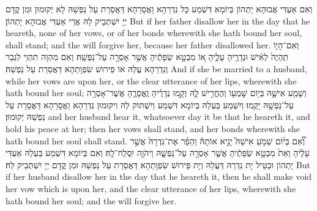 {וְאִם אַעְדִּי אֲבוּהָא יָתְהוֹן בְּיוֹמָא דִּשְׁמַע כָּל נִדְרַהָא וַאֲסָרַהָא דַּאֲסַרַת עַל נַפְשַׁהּ לָא יְקוּמוּן וּמִן קֳדָם יְיָ יִשְׁתְּבֵיק לַהּ אֲרֵי אַעְדִּי אֲבוּהָא יָתְהוֹן׃}
{But if her father disallow her in the day that he heareth, none of her vows, or of her bonds wherewith she hath bound her soul, shall stand; and the \lord\space will forgive her, because her father disallowed her.}{}
{וְאִם־הָי֤וֹ תִֽהְיֶה֙ לְאִ֔ישׁ וּנְדָרֶ֖יהָ עָלֶ֑יהָ א֚וֹ מִבְטָ֣א שְׂפָתֶ֔יהָ אֲשֶׁ֥ר אָסְרָ֖ה עַל־נַפְשָֽׁהּ׃
}
{וְאִם מִהְוָה תִהְוֵי לִגְבַר וְנִדְרַהָא עֲלַהּ אוֹ פֵירוּשׁ שִׂפְוָתַהָא דַּאֲסַרַת עַל נַפְשַׁהּ׃}
{And if she be married to a husband, while her vows are upon her, or the clear utterance of her lips, wherewith she hath bound her soul;}{}
{וְשָׁמַ֥ע אִישָׁ֛הּ בְּי֥וֹם שׇׁמְע֖וֹ וְהֶחֱרִ֣ישׁ לָ֑הּ וְקָ֣מוּ נְדָרֶ֗יהָ וֶֽאֱסָרֶ֛הָ אֲשֶׁר־אָסְרָ֥ה עַל־נַפְשָׁ֖הּ יָקֻֽמוּ׃
}
{וְיִשְׁמַע בַּעְלַהּ בְּיוֹמָא דִּשְׁמַע וְיִשְׁתּוֹק לַהּ וִיקוּמוּן נִדְרַהָא וַאֲסָרַהָא דַּאֲסַרַת עַל נַפְשַׁהּ יְקוּמוּן׃}
{and her husband hear it, whatsoever day it be that he heareth it, and hold his peace at her; then her vows shall stand, and her bonds wherewith she hath bound her soul shall stand.}{}
{וְ֠אִ֠ם בְּי֨וֹם שְׁמֹ֣עַ אִישָׁהּ֮ יָנִ֣יא אוֹתָהּ֒ וְהֵפֵ֗ר אֶת־נִדְרָהּ֙ אֲשֶׁ֣ר עָלֶ֔יהָ וְאֵת֙ מִבְטָ֣א שְׂפָתֶ֔יהָ אֲשֶׁ֥ר אָסְרָ֖ה עַל־נַפְשָׁ֑הּ וַיהֹוָ֖ה יִֽסְלַֽח־לָֽהּ׃
}
{וְאִם בְּיוֹמָא דִּשְׁמַע בַּעְלַהּ אַעְדִּי יָתְהוֹן וּבַטֵּיל יָת נִדְרַהּ דַּעֲלַהּ וְיָת פֵּירוּשׁ שִׂפְוָתַהָא דַּאֲסַרַת עַל נַפְשַׁהּ וּמִן קֳדָם יְיָ יִשְׁתְּבֵיק לַהּ׃}
{But if her husband disallow her in the day that he heareth it, then he shall make void her vow which is upon her, and the clear utterance of her lips, wherewith she hath bound her soul; and the \lord\space will forgive her.}{}
